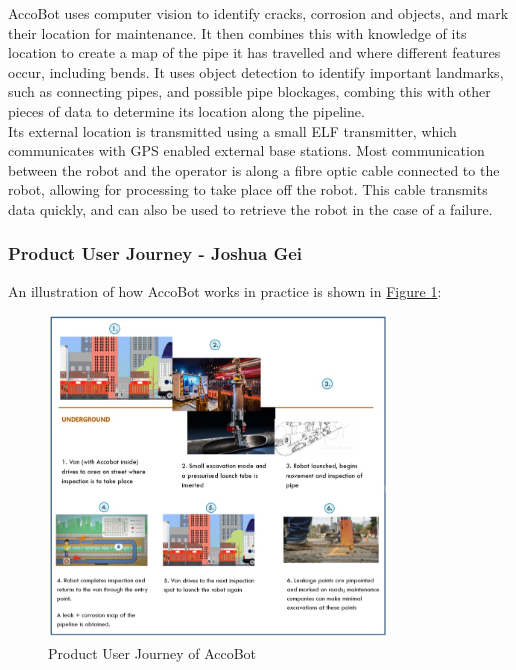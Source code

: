 \documentclass[11pt]{article}		%
\newcommand{\figref}[1]{\hyperref[#1]{Figure \ref*{#1}}}    %
\begin{document}
			\hspace*{2ex} AccoBot uses computer vision to identify cracks, corrosion and objects, and mark their location for maintenance.
			It then combines this with knowledge of its location to create a map of the pipe it has travelled and where different features occur, including bends.
			It uses object detection to identify important landmarks, such as connecting pipes, and possible pipe blockages, combing this with other pieces of data to determine its location along the pipeline.
			\\
			\hspace*{2ex} Its external location is transmitted using a small ELF transmitter, which communicates with GPS enabled external base stations. 
			Most communication between the robot and the operator is along a fibre optic cable connected to the robot, allowing for processing to take place off the robot.
			This cable transmits data quickly, and can also be used to retrieve the robot in the case of a failure.
			
			\subsubsection[Product User Journey]{Product User Journey - Joshua Gei} \label{userJourney}
			
            An illustration of how AccoBot works in practice is shown in \figref{userjourney}:
	        \begin{figure}[h]
				\centering
				\includegraphics[width=0.8\textwidth]{userjourneyfull.jpg}
				\caption{Product User Journey of AccoBot}
				\label{userjourney}
			\end{figure}
\end{document}

